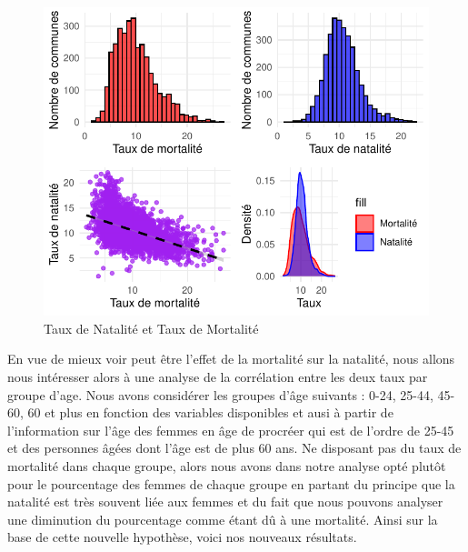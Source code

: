 \documentclass[
]{article}
\begin{document}
\begin{figure}

{\centering \includegraphics{rapport_intermediaire_files/figure-latex/unnamed-chunk-17-1} 

}

\caption{Taux de Natalité et Taux de Mortalité}\label{fig:unnamed-chunk-17}
\end{figure}

En vue de mieux voir peut être l'effet de la mortalité sur la natalité,
nous allons nous intéresser alors à une analyse de la corrélation entre
les deux taux par groupe d'age. Nous avons considérer les groupes d'âge
suivants : 0-24, 25-44, 45-60, 60 et plus en fonction des variables
disponibles et ausi à partir de l'information sur l'âge des femmes en
âge de procréer qui est de l'ordre de 25-45 et des personnes âgées dont
l'âge est de plus 60 ans. Ne disposant pas du taux de mortalité dans
chaque groupe, alors nous avons dans notre analyse opté plutôt pour le
pourcentage des femmes de chaque groupe en partant du principe que la
natalité est très souvent liée aux femmes et du fait que nous pouvons
analyser une diminution du pourcentage comme étant dû à une mortalité.
Ainsi sur la base de cette nouvelle hypothèse, voici nos nouveaux
résultats.
\end{document}
